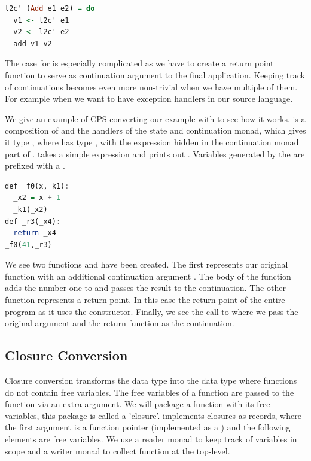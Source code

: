 {\begin{lstlisting}[language=Haskell]
l2c' (Add e1 e2) = do
  v1 <- l2c' e1
  v2 <- l2c' e2
  add v1 v2
\end{lstlisting}

The case for  is especially complicated as we have to create a return point function to serve as continuation argument to the final application. Keeping track of continuations becomes even more non-trivial when we have multiple of them. For example when we want to have exception handlers in our source language.

We give an example of CPS converting our example  with  to see how it works.  is a composition of  and the handlers of the state and continuation monad, which gives it type , where  has type , with the  expression hidden in the continuation monad part of .  takes a simple  expression and prints out . Variables generated by the  are prefixed with a \icode{_}.

\begin{lstlisting}[language=Haskell]
def _f0(x,_k1):
  _x2 = x + 1
  _k1(_x2)
def _r3(_x4):
  return _x4
_f0(41,_r3)
\end{lstlisting}

We see two functions  and  have been created. The first represents our original function with an additional continuation argument . The body of the function adds the number one to  and passes the result to the continuation. The other function represents a return point. In this case the return point of the entire program as it uses the  constructor. Finally, we see the call to  where we pass the original argument and the return function as the continuation.

\subsection{\label{section:closconvert}Closure Conversion}
Closure conversion transforms the  data type into the  data type where functions do not contain free variables. The free variables of a function are passed to the function via an extra argument. We will package a function with its free variables, this package is called a 'closure'.  implements closures as records, where the first argument is a function pointer (implemented as a ) and the following elements are free variables. We use a reader monad to keep track of variables in scope and a writer monad to collect function at the top-level.

}
